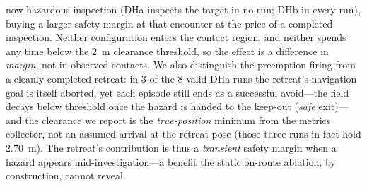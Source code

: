 now-hazardous inspection (DHa inspects the target in no run; DHb in every run),
buying a larger safety margin at that encounter at the price of a completed
inspection. Neither configuration enters the contact region, and neither spends
any time below the $2$~m clearance threshold, so the effect is a difference in
\emph{margin}, not in observed contacts. We also distinguish the preemption
firing from a cleanly completed retreat: in $3$ of the $8$ valid DHa runs the
retreat's navigation goal is itself aborted, yet each episode still ends as a
successful avoid---the field decays below threshold once the hazard is handed to
the keep-out (\emph{safe} exit)---and the clearance we report is the
\emph{true-position} minimum from the metrics collector, not an assumed arrival at
the retreat pose (those three runs in fact hold $2.70$~m). The retreat's
contribution is thus a \emph{transient} safety margin when a hazard appears
mid-investigation---a benefit the static on-route ablation, by construction,
cannot reveal.

